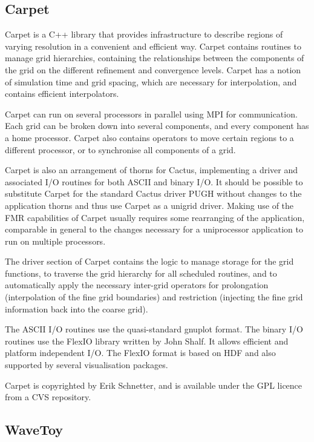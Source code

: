 \subsection{Carpet}

Carpet is a C++ library that provides infrastructure to describe
regions of varying resolution in a convenient and efficient way.
Carpet contains routines to manage grid hierarchies, containing the
relationships between the components of the grid on the different
refinement and convergence levels.  Carpet has a notion of simulation
time and grid spacing, which are necessary for interpolation, and
contains efficient interpolators.

Carpet can run on several processors in parallel using MPI for
communication.  Each grid can be broken down into several components,
and every component has a home processor.  Carpet also contains
operators to move certain regions to a different processor, or to
synchronise all components of a grid.

Carpet is also an arrangement of thorns for Cactus, implementing a
driver and associated I/O routines for both ASCII and binary I/O.  It
should be possible to substitute Carpet for the standard Cactus driver
PUGH without changes to the application thorns and thus use Carpet as
a unigrid driver.  Making use of the FMR capabilities of Carpet
usually requires some rearranging of the application, comparable in
general to the changes necessary for a uniprocessor application to run
on multiple processors.

The driver section of Carpet contains the logic to manage storage for
the grid functions, to traverse the grid hierarchy for all scheduled
routines, and to automatically apply the necessary inter-grid
operators for prolongation (interpolation of the fine grid boundaries)
and restriction (injecting the fine grid information back into the
coarse grid).

The ASCII I/O routines use the quasi-standard gnuplot
\cite{Carpet__gnuplot-info} format.  The binary I/O routines use the
FlexIO library \cite{Carpet__FlexIO} written by John Shalf.  It allows
efficient and platform independent I/O.  The FlexIO format is based on
HDF \cite{Carpet__HDF} and also supported by several visualisation
packages.

Carpet is copyrighted by Erik Schnetter, and is available under the
GPL licence from a CVS \cite{Carpet__CVS} repository.

\subsection{WaveToy}

